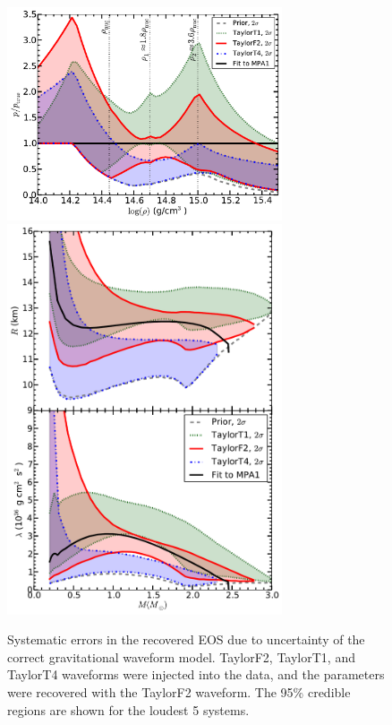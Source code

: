\documentclass[twocolumn,prd,amssymb,aps,nofootinbib,showpacs,epsf]{revtex4}
\begin{document}
\begin{figure}[!htb]
\begin{center}
\includegraphics[width=3.2in]{LALMCMCmpa1FitCompareF2T1T4ZeroNoiseperror.pdf}\\
\includegraphics[width=3.2in]{LALMCMCmpa1FitCompareF2T1T4ZeroNoiseRadiuslambda.pdf}
\caption{Systematic errors in the recovered EOS due to uncertainty of the correct gravitational waveform model. TaylorF2, TaylorT1, and TaylorT4 waveforms were injected into the data, and the parameters were recovered with the TaylorF2 waveform. The 95\% credible regions are shown for the loudest 5 systems.}
\label{fig:systematic}
\end{center}
\end{figure}
\end{document}
